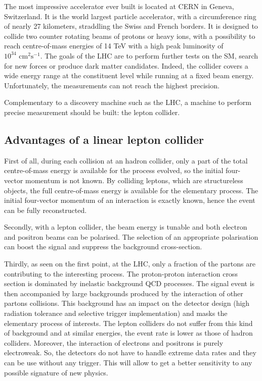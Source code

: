   The most impressive accelerator ever built is located at CERN in Geneva, Switzerland. 
  It is the world largest particle accelerator, with a circumference ring of nearly 27 kilometers, straddling the Swiss and French borders.
  It is designed to collide two counter rotating beams of protons or heavy ions, with a possibility to reach centre-of-mass energies of 14 TeV with a high peak luminosity of $10^{34} \text{ cm}^2 \text{s}^{-1}$.
  The goals of the LHC are to perform further tests on the SM, search for new forces or produce dark matter candidates. 
  Indeed, the collider covers a wide energy range at the constituent level while running at a fixed beam energy.
  Unfortunately, the measurements can not reach the highest precision.
  
  Complementary to a discovery machine such as the LHC, a machine to perform precise measurement should be built: the lepton collider.

    \subsection{Advantages of a linear lepton collider}
    
    First of all, during each collision at an hadron collider, only a part of the total centre-of-mass energy is available for the process evolved, so the initial four-vector momentum is not known. 
    By colliding leptons, which are structureless objects, the full centre-of-mass energy is available for the elementary process. 
    The initial four-vector momentum of an interaction is exactly known, hence the event can be fully reconstructed.

    Secondly, with a lepton collider, the beam energy is tunable and both electron and positron beams can be polarised. 
    The selection of an appropriate polarisation can boost the signal and suppress the background cross-section. 

    Thirdly, as seen on the first point, at the LHC, only a fraction of the partons are contributing to the interesting process. 
    The proton-proton interaction cross section is dominated by inelastic background QCD processes.
    The signal event is then accompanied by large backgrounds produced by the interaction of other partons collisions.
    This background has an impact on the detector design (high radiation tolerance and selective trigger implementation) and masks the elementary process of interests. 
    The lepton colliders do not suffer from this kind of background and at similar energies, the event rate is lower as those of hadron colliders.
    Moreover, the interaction of electrons and positrons is purely electroweak.
    So, the detectors do not have to handle extreme data rates and they can be use without any trigger.
    This will allow to get a better sensitivity to any possible signature of new physics.

